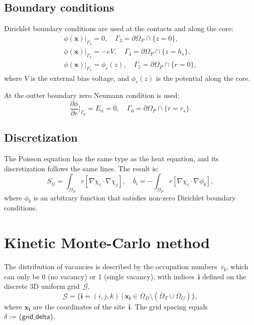 \documentclass[10pt]{article}
\renewcommand{\vec}[1]{\mathbf{#1}}
\newcommand{\vi}{\vec{i}}
\newcommand{\vx}{\vec{x}}
\begin{document}
\subsection{Boundary conditions}

Dirichlet boundary conditions are used at the contacts and along the core:
\begin{gather}
	\phi(\vx)\vert_{\Gamma_3} = 0, \quad
	\Gamma_3 = \partial\Omega_P \cap \{ z = 0 \},\\
	\phi(\vx)\vert_{\Gamma_4} = -eV, \quad
	\Gamma_4 = \partial\Omega_P \cap \{ z = h_s \},\\
	\phi(\vx)\vert_{\Gamma_5} = \phi_c(z),
	\quad \Gamma_5 = \partial\Omega_P \cap \{ r = 0 \},
\end{gather}
where $V$ is the external bias voltage, and $\phi_c(z)$ is the potential along
the core.

At the outter boundary zero Neumann condition is used:
\begin{equation}
	\frac{\partial \phi}{\partial r} \bigg\vert_{\Gamma_6} = E_n = 0, \quad
	\Gamma_6 = \partial \Omega_P \cap \{ r = r_s \}.
\end{equation}

\subsection{Discretization}

The Poisson equation has the same type as the heat equation, and its
discretization follows the same lines. The result is:
\begin{equation}
	S_{ij} = \int_{\Omega_P} r [ \nabla\chi_i \cdot \nabla\chi_j ], \quad
	b_i = - \int_{\Omega_P} r [ \nabla\chi_i \cdot \nabla \phi_b ],
\end{equation}
where $\phi_b$ is an arbitrary function that satisfies non-zero Dirichlet
boundary conditions.

\section{Kinetic Monte-Carlo method}

The distribution of vacancies is described by the occupation numbers~$v_\vi$,
which can only be 0 (no vacancy) or 1 (single vacancy), with indices~$\vi$
defined on the discrete 3D uniform grid~$\mathcal{G}$,
\begin{equation}
	\mathcal{G} = \{ \vi = (i, j, k) \ | \ \vx_\vi \in
	\overline\Omega_D \setminus ( \overline\Omega_T \cup \overline\Omega_G ) \},
\end{equation}
where $\vx_\vi$ are the coordinates of the site~$\vi$. The grid spacing equals
$\delta := \{ \mathsf{grid\_delta} \}$.
\end{document}
